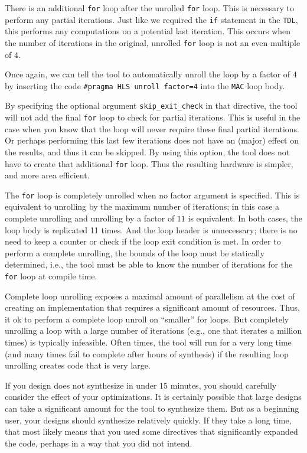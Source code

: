 There is an additional \lstinline{for} loop after the unrolled \lstinline{for} loop. This is necessary to perform any partial iterations. Just like we required the \lstinline{if} statement in the \lstinline{TDL}, this performs any computations on a potential last iteration. This occurs when the number of iterations in the original, unrolled \lstinline{for} loop is not an even multiple of $4$. 

Once again, we can tell the \VHLS tool to automatically unroll the loop by a factor of $4$ by inserting the code \lstinline{#pragma HLS unroll factor=4} into the \lstinline{MAC} loop body. 

By specifying the optional argument \lstinline{skip_exit_check} in that directive, the \VHLS tool will not add the final \lstinline{for} loop to check for partial iterations. This is useful in the case when you know that the loop will never require these final partial iterations. Or perhaps performing this last few iterations does not have an (major) effect on the results, and thus it can be skipped. By using this option, the \VHLS tool does not have to create that additional \lstinline{for} loop. Thus the resulting hardware is simpler, and more area efficient.

The \lstinline{for} loop is completely unrolled when no factor argument is specified. This is equivalent to unrolling by the maximum number of iterations; in this case a complete unrolling and unrolling by a factor of $11$ is equivalent. In both cases, the loop body is replicated 11 times. And the loop header is unnecessary; there is no need to keep a counter or check if the loop exit condition is met. In order to perform a complete unrolling, the bounds of the loop must be statically determined, i.e., the \VHLS tool must be able to know the number of iterations for the \lstinline{for} loop at compile time.

Complete loop unrolling exposes a maximal amount of parallelism at the cost of creating an implementation that requires a significant amount of resources. Thus, it ok to perform a complete loop unroll on ``smaller'' for loops. But completely unrolling a loop with a large number of iterations (e.g., one that iterates a million times) is typically infeasible. Often times, the \VHLS tool will run for a very long time (and many times fail to complete after hours of synthesis) if the resulting loop unrolling creates code that is very large. 

\begin{aside}
If you design does not synthesize in under 15 minutes, you should carefully consider the effect of your optimizations. It is certainly possible that large designs can take a significant amount for the \VHLS tool to synthesize them. But as a beginning user, your designs should synthesize relatively quickly.  If they take a long time, that most likely means that you used some directives that significantly expanded the code, perhaps in a way that you did not intend.
\end{aside}

